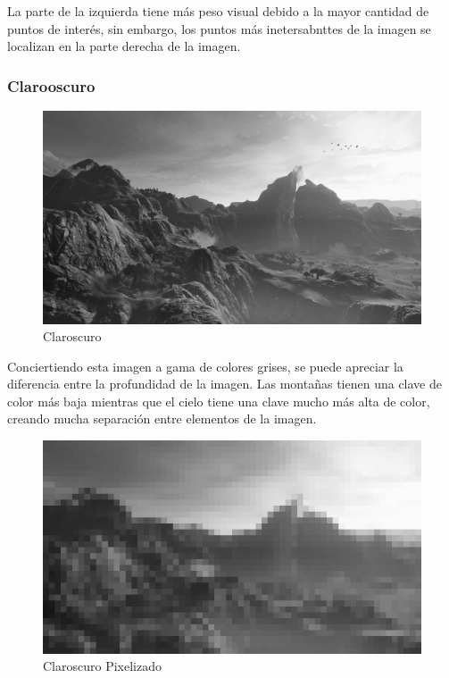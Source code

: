 \documentclass[12pt]{article}
\begin{document}
            La parte de la izquierda tiene más peso visual debido a la mayor cantidad de puntos de interés, sin embargo, los puntos más inetersabnttes de la imagen se localizan en la parte derecha de la imagen. 
      
        \subsubsection{Clarooscuro}
          \begin{figure}[H]
            \centering
            \includegraphics[width=\textwidth]{Jesus/Seccion16/claroscuro.jpg}
            \caption{Claroscuro}
          \end{figure}

          Conciertiendo esta imagen a gama de colores grises, se puede apreciar la diferencia entre la profundidad de la imagen. 
          Las montañas tienen una clave de color más baja mientras que el cielo tiene una clave mucho más alta de color, creando mucha separación entre elementos de la imagen. 

          \begin{figure}[H]
            \centering
            \includegraphics[width=\textwidth]{Jesus/Seccion16/pixelart.jpg}
            \caption{Claroscuro Pixelizado}
          \end{figure}
\end{document}
